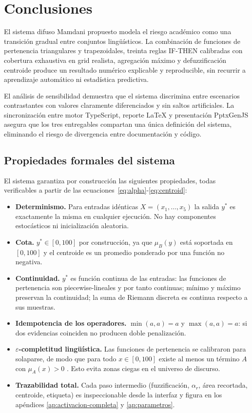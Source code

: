 \section{Conclusiones}

El sistema difuso Mamdani propuesto modela el riesgo académico como una transición gradual entre conjuntos lingüísticos. La combinación de funciones de pertenencia triangulares y trapezoidales, treinta reglas IF-THEN calibradas con cobertura exhaustiva en grid realista, agregación máximo y defuzzificación centroide produce un resultado numérico explicable y reproducible, sin recurrir a aprendizaje automático ni estadística predictiva.

El análisis de sensibilidad demuestra que el sistema discrimina entre escenarios contrastantes con valores claramente diferenciados y sin saltos artificiales. La sincronización entre motor TypeScript, reporte LaTeX y presentación PptxGenJS asegura que los tres entregables compartan una única definición del sistema, eliminando el riesgo de divergencia entre documentación y código.

\subsection{Propiedades formales del sistema}

El sistema garantiza por construcción las siguientes propiedades, todas verificables a partir de las ecuaciones~\eqref{eq:alpha}-\eqref{eq:centroid}:

\begin{itemize}
  \item \textbf{Determinismo.} Para entradas idénticas $X=(x_1,\ldots,x_5)$ la salida $y^*$ es exactamente la misma en cualquier ejecución. No hay componentes estocásticos ni inicialización aleatoria.
  \item \textbf{Cota.} $y^*\in[0,100]$ por construcción, ya que $\mu_B(y)$ está soportada en $[0,100]$ y el centroide es un promedio ponderado por una función no negativa.
  \item \textbf{Continuidad.} $y^*$ es función continua de las entradas: las funciones de pertenencia son piecewise-lineales y por tanto continuas; mínimo y máximo preservan la continuidad; la suma de Riemann discreta es continua respecto a sus muestras.
  \item \textbf{Idempotencia de los operadores.} $\min(a,a)=a$ y $\max(a,a)=a$: si dos evidencias coinciden no producen doble penalización.
  \item \textbf{$\varepsilon$-completitud lingüística.} Las funciones de pertenencia se calibraron para solaparse, de modo que para todo $x\in[0,100]$ existe al menos un término $A$ con $\mu_A(x)>0$ \citep{lee1990fuzzy}. Esto evita zonas ciegas en el universo de discurso.
  \item \textbf{Trazabilidad total.} Cada paso intermedio (fuzzificación, $\alpha_r$, área recortada, centroide, etiqueta) es inspeccionable desde la interfaz y figura en los apéndices \ref{ap:activacion-completa} y \ref{ap:parametros}.
\end{itemize}

